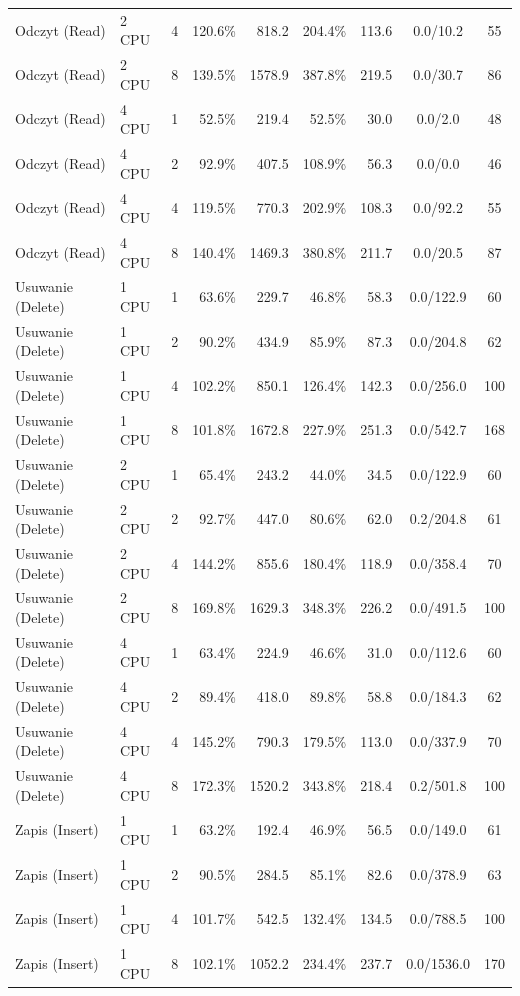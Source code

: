 \begin{table}[ht]
{\begin{tabular}{llcrrrrcc}
Odczyt (Read) & 2 CPU & 4 & 120.6\% & 818.2 & 204.4\% & 113.6 & 0.0/10.2 & 55 \\
Odczyt (Read) & 2 CPU & 8 & 139.5\% & 1578.9 & 387.8\% & 219.5 & 0.0/30.7 & 86 \\
Odczyt (Read) & 4 CPU & 1 & 52.5\% & 219.4 & 52.5\% & 30.0 & 0.0/2.0 & 48 \\
Odczyt (Read) & 4 CPU & 2 & 92.9\% & 407.5 & 108.9\% & 56.3 & 0.0/0.0 & 46 \\
Odczyt (Read) & 4 CPU & 4 & 119.5\% & 770.3 & 202.9\% & 108.3 & 0.0/92.2 & 55 \\
Odczyt (Read) & 4 CPU & 8 & 140.4\% & 1469.3 & 380.8\% & 211.7 & 0.0/20.5 & 87 \\
Usuwanie (Delete) & 1 CPU & 1 & 63.6\% & 229.7 & 46.8\% & 58.3 & 0.0/122.9 & 60 \\
Usuwanie (Delete) & 1 CPU & 2 & 90.2\% & 434.9 & 85.9\% & 87.3 & 0.0/204.8 & 62 \\
Usuwanie (Delete) & 1 CPU & 4 & 102.2\% & 850.1 & 126.4\% & 142.3 & 0.0/256.0 & 100 \\
Usuwanie (Delete) & 1 CPU & 8 & 101.8\% & 1672.8 & 227.9\% & 251.3 & 0.0/542.7 & 168 \\
Usuwanie (Delete) & 2 CPU & 1 & 65.4\% & 243.2 & 44.0\% & 34.5 & 0.0/122.9 & 60 \\
Usuwanie (Delete) & 2 CPU & 2 & 92.7\% & 447.0 & 80.6\% & 62.0 & 0.2/204.8 & 61 \\
Usuwanie (Delete) & 2 CPU & 4 & 144.2\% & 855.6 & 180.4\% & 118.9 & 0.0/358.4 & 70 \\
Usuwanie (Delete) & 2 CPU & 8 & 169.8\% & 1629.3 & 348.3\% & 226.2 & 0.0/491.5 & 100 \\
Usuwanie (Delete) & 4 CPU & 1 & 63.4\% & 224.9 & 46.6\% & 31.0 & 0.0/112.6 & 60 \\
Usuwanie (Delete) & 4 CPU & 2 & 89.4\% & 418.0 & 89.8\% & 58.8 & 0.0/184.3 & 62 \\
Usuwanie (Delete) & 4 CPU & 4 & 145.2\% & 790.3 & 179.5\% & 113.0 & 0.0/337.9 & 70 \\
Usuwanie (Delete) & 4 CPU & 8 & 172.3\% & 1520.2 & 343.8\% & 218.4 & 0.2/501.8 & 100 \\
Zapis (Insert) & 1 CPU & 1 & 63.2\% & 192.4 & 46.9\% & 56.5 & 0.0/149.0 & 61 \\
Zapis (Insert) & 1 CPU & 2 & 90.5\% & 284.5 & 85.1\% & 82.6 & 0.0/378.9 & 63 \\
Zapis (Insert) & 1 CPU & 4 & 101.7\% & 542.5 & 132.4\% & 134.5 & 0.0/788.5 & 100 \\
Zapis (Insert) & 1 CPU & 8 & 102.1\% & 1052.2 & 234.4\% & 237.7 & 0.0/1536.0 & 170 \\

\end{tabular}}
\end{table}
